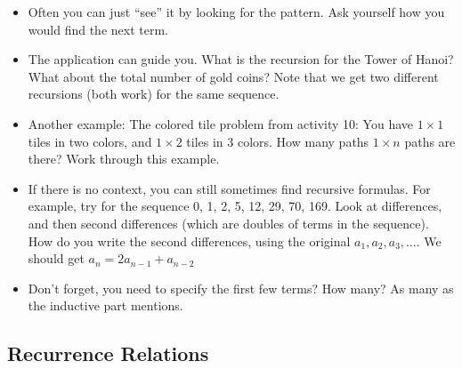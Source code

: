 \begin{itemize}
\begin{itemize}
\item Often you can just ``see'' it by looking for the pattern.  Ask yourself how you would find the next term.
\item The application can guide you.  What is the recursion for the Tower of Hanoi?  What about the total number of gold coins?  Note that we get two different recursions (both work) for the same sequence.
\item Another example: The colored tile problem from activity 10: You have $1 \times 1$ tiles in two colors, and $1\times 2$ tiles in 3 colors.  How many paths $1\times n$ paths are there?  Work through this example.
\item If there is no context, you can still sometimes find recursive formulas.  For example, try for the sequence 0, 1, 2, 5, 12, 29, 70, 169.  Look at differences, and then second differences (which are doubles of terms in the sequence).  How do you write the second differences, using the original $a_1, a_2, a_3,\ldots$.  We should get $a_n = 2a_{n-1} + a_{n-2}$
\item Don't forget, you need to specify the first few terms?  How many?  As many as the inductive part mentions.
\end{itemize}

\end{itemize}

\subsection*{Recurrence Relations}

